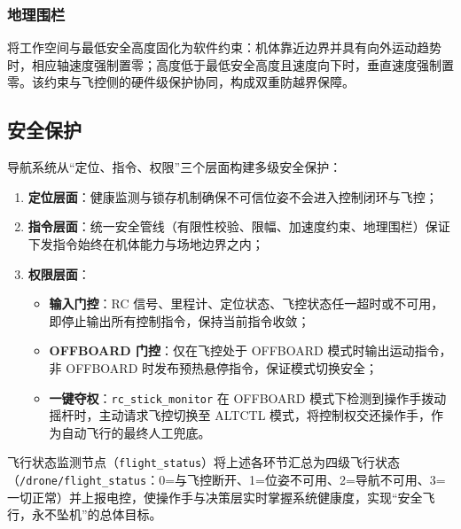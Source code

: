 \subsubsection{地理围栏}
将工作空间与最低安全高度固化为软件约束：机体靠近边界并具有向外运动趋势时，相应轴速度强制置零；高度低于最低安全高度且速度向下时，垂直速度强制置零。该约束与飞控侧的硬件级保护协同，构成双重防越界保障。

\subsection{安全保护}
导航系统从“定位、指令、权限”三个层面构建多级安全保护：
\begin{enumerate}
    \item \textbf{定位层面}：健康监测与锁存机制确保不可信位姿不会进入控制闭环与飞控；
    \item \textbf{指令层面}：统一安全管线（有限性校验、限幅、加速度约束、地理围栏）保证下发指令始终在机体能力与场地边界之内；
    \item \textbf{权限层面}：
        \begin{itemize}
            \item \textbf{输入门控}：RC 信号、里程计、定位状态、飞控状态任一超时或不可用，即停止输出所有控制指令，保持当前指令收敛；
            \item \textbf{OFFBOARD 门控}：仅在飞控处于 OFFBOARD 模式时输出运动指令，非 OFFBOARD 时发布预热悬停指令，保证模式切换安全；
            \item \textbf{一键夺权}：\lstinline{rc_stick_monitor} 在 OFFBOARD 模式下检测到操作手拨动摇杆时，主动请求飞控切换至 ALTCTL 模式，将控制权交还操作手，作为自动飞行的最终人工兜底。
        \end{itemize}
\end{enumerate}
飞行状态监测节点（\lstinline{flight_status}）将上述各环节汇总为四级飞行状态（\lstinline{/drone/flight_status}：0=与飞控断开、1=位姿不可用、2=导航不可用、3=一切正常）并上报电控，使操作手与决策层实时掌握系统健康度，实现“安全飞行，永不坠机”的总体目标。
